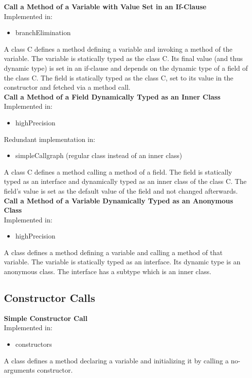 \documentclass{article}
\begin{document}
\noindent
\textbf{Call a Method of a Variable with Value Set in an If-Clause}\\
Implemented in: 
\begin{itemize}
    \item branchElimination
\end{itemize}
A class C defines a method defining a variable and invoking a method of the variable. The variable is statically typed as the class C. Its final value (and thus dynamic type) is set in an if-clause and depends on the dynamic type of a field of the class C. The field is statically typed as the class C, set to its value in the constructor and fetched via a method call.\\

\noindent
\textbf{Call a Method of a Field Dynamically Typed as an Inner Class}\\
Implemented in: 
\begin{itemize}
    \item highPrecision
\end{itemize}
Redundant implementation in: 
\begin{itemize}
    \item simpleCallgraph (regular class instead of an inner class)
\end{itemize}
A class C defines a method calling a method of a field. The field is statically typed as an interface and dynamically typed as an inner class of the class C. The field's value is set as the default value of the field and not changed afterwards.\\

\noindent
\textbf{Call a Method of a Variable Dynamically Typed as an Anonymous Class}\\
Implemented in: 
\begin{itemize}
    \item highPrecision
\end{itemize}
A class defines a method defining a variable and calling a method of that variable. The variable is statically typed as an interface. Its dynamic type is an anonymous class. The interface has a subtype which is an inner class.\\

\subsection{Constructor Calls}

\textbf{Simple Constructor Call}\\
Implemented in: 
\begin{itemize}
    \item constructors
\end{itemize}
A class defines a method declaring a variable and initializing it by calling a no-arguments constructor.\\
\end{document}
